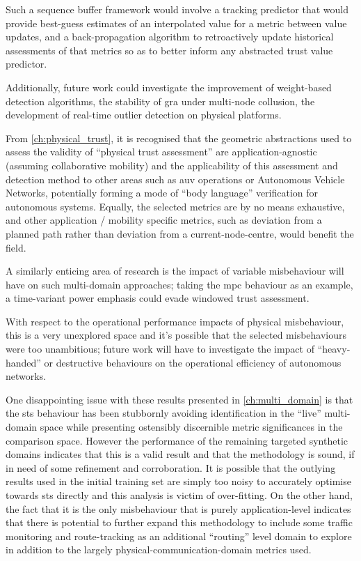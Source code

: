 Such a sequence buffer framework would involve a tracking predictor that would provide best-guess estimates of an interpolated value for a metric between value updates, and a back-propagation algorithm to retroactively update historical assessments of that metrics so as to better inform any abstracted trust value predictor.

Additionally, future work could investigate the improvement of weight-based detection algorithms, the stability of \gls{gra} under multi-node collusion, the development of real-time outlier detection on physical platforms.

From \autoref{ch:physical_trust}, it is recognised that the geometric abstractions used to assess the validity of ``physical trust assessment'' are application-agnostic (assuming collaborative mobility) and the applicability of this assessment and detection method to other areas such as \gls{auv} operations or Autonomous Vehicle Networks, potentially forming a mode of ``body language'' verification for autonomous systems. 
Equally, the selected metrics are by no means exhaustive, and other application / mobility specific metrics, such as deviation from a planned path rather than deviation from a current-node-centre, would benefit the field.

A similarly enticing area of research is the impact of variable misbehaviour will have on such multi-domain approaches; taking the \gls{mpc} behaviour as an example, a time-variant power emphasis could evade windowed trust assessment.

With respect to the operational performance impacts of physical misbehaviour, this is a very unexplored space and it's possible that the selected misbehaviours were too unambitious; future work will have to investigate the impact of ``heavy-handed'' or destructive behaviours on the operational efficiency of autonomous networks.

One disappointing issue with these results presented in \autoref{ch:multi_domain} is that the \gls{sts} behaviour has been stubbornly avoiding identification in the ``live'' multi-domain space while presenting ostensibly discernible metric significances in the comparison space. 
However the performance of the remaining targeted synthetic domains indicates that this is a valid result and that the methodology is sound, if in need of some refinement and corroboration.
It is possible that the outlying results used in the initial training set are simply too noisy to accurately optimise towards \gls{sts} directly and this analysis is victim of over-fitting. 
On the other hand, the fact that it is the only misbehaviour that is purely application-level indicates that there is potential to further expand this methodology to include some traffic monitoring and route-tracking as an additional ``routing'' level domain to explore in addition to the largely physical-communication-domain metrics used.


